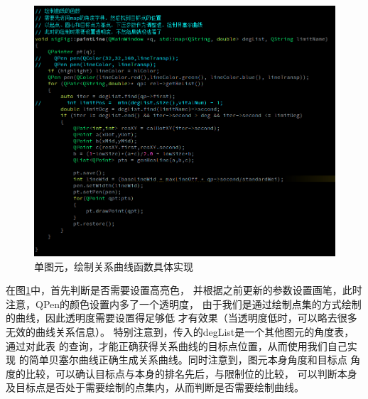 \documentclass[a4paper,UTF8]{article}
\numberwithin{equation}{section}
\begin{document}
\begin{figure}[htbp]
    \centering
    \includegraphics[width = 15cm]{task6-sigFig-PaintLine.png}
    \caption{单图元，绘制关系曲线函数具体实现}
    \label{task6-sigFig-PaintLine}
\end{figure}
在图\ref{task6-sigFig-PaintLine}中，首先判断是否需要设置高亮色，
并根据之前更新的参数设置画笔，此时注意，QPen的颜色设置内多了一个透明度，
由于我们是通过绘制点集的方式绘制的曲线，因此透明度需要设置得足够低
才有效果（当透明度低时，可以略去很多无效的曲线关系信息）。
特别注意到，传入的degList是一个其他图元的角度表，通过对此表
的查询，才能正确获得关系曲线的目标点位置，从而使用我们自己实现
的简单贝塞尔曲线正确生成关系曲线。同时注意到，图元本身角度和目标点
角度的比较，可以确认目标点与本身的排名先后，与限制位的比较，
可以判断本身及目标点是否处于需要绘制的点集内，从而判断是否需要绘制曲线。
\end{document}

